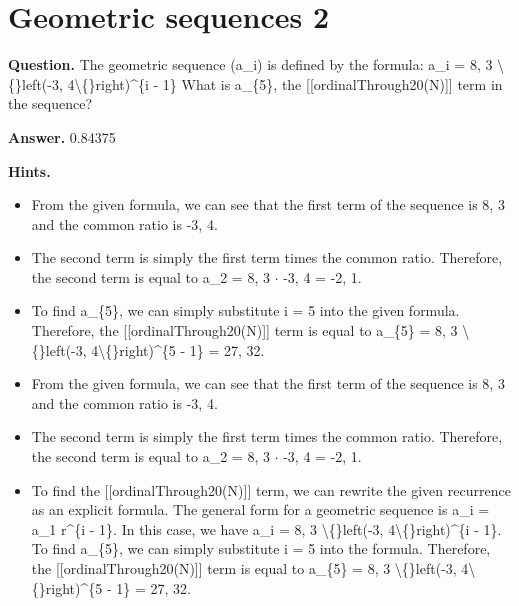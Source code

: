 \documentclass{article}
\begin{document}
\section*{Geometric sequences 2}
\textbf{Question.} The geometric sequence (a\_i) is defined by the formula:
                a\_i = 8, 3 \textbackslash\{\}left(-3, 4\textbackslash\{\}right)\textasciicircum{}\{i - 1\}
                What is a\_\{5\}, the [[ordinalThrough20(N)]] term in the sequence?

\textbf{Answer.} 0.84375

\textbf{Hints.}
\begin{itemize}
  \item From the given formula, we can see that the first term of the sequence is 8, 3 and the common ratio is -3, 4.
  \item The second term is simply the first term times the common ratio.
                    Therefore, the second term is equal to a\_2 = 8, 3 $\cdot$ -3, 4 = -2, 1.
  \item To find a\_\{5\}, we can simply substitute i = 5 into the given formula.
                    Therefore, the [[ordinalThrough20(N)]] term is equal to a\_\{5\} = 8, 3 \textbackslash\{\}left(-3, 4\textbackslash\{\}right)\textasciicircum{}\{5 - 1\} = 27, 32.
  \item From the given formula, we can see that the first term of the sequence is 8, 3 and the common ratio is -3, 4.
  \item The second term is simply the first term times the common ratio.
                    Therefore, the second term is equal to a\_2 = 8, 3 $\cdot$ -3, 4 = -2, 1.
  \item To find the [[ordinalThrough20(N)]] term, we can rewrite the given recurrence as an explicit formula.
                    The general form for a geometric sequence is a\_i = a\_1 r\textasciicircum{}\{i - 1\}. In this case, we have a\_i = 8, 3 \textbackslash\{\}left(-3, 4\textbackslash\{\}right)\textasciicircum{}\{i - 1\}.
                    To find a\_\{5\}, we can simply substitute i = 5 into the formula.
                    Therefore, the [[ordinalThrough20(N)]] term is equal to a\_\{5\} = 8, 3 \textbackslash\{\}left(-3, 4\textbackslash\{\}right)\textasciicircum{}\{5 - 1\} = 27, 32.
\end{itemize}
\end{document}
